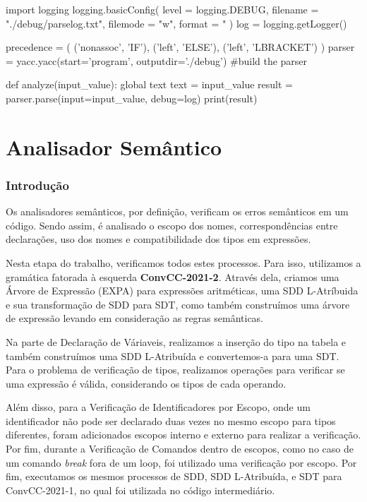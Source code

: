 \documentclass[
	12pt,				%
	openright,			%
	twoside,			%
	a4paper,			%
	english,			%
	french,				%
	spanish,			%
	brazil				%
	]{abntex2}
\begin{document}
\begin{python}
import logging
logging.basicConfig(
    level = logging.DEBUG,
    filename = "./debug/parselog.txt",
    filemode = "w",
    format = "%
)
log = logging.getLogger()

precedence = (
    ('nonassoc', 'IF'), 
    ('left', 'ELSE'),
    ('left', 'LBRACKET')
)
parser = yacc.yacc(start='program', outputdir='./debug')  #build the parser

def analyze(input_value):
    global text
    text = input_value
    result = parser.parse(input=input_value, debug=log)
    print(result)
\end{python}


\part{Analisador Semântico}

\section{Introdução}
Os analisadores semânticos, por definição, verificam os erros semânticos em um código.
Sendo assim, é analisado o escopo dos nomes, correspondências entre declarações, uso dos nomes e
compatibilidade dos tipos em expressões.

Nesta etapa do trabalho, verificamos todos estes processos.
Para isso, utilizamos a gramática fatorada à esquerda \textbf{ConvCC-2021-2}.
Através dela, criamos uma Árvore de Expressão (EXPA) para expressões aritméticas, uma SDD L-Atríbuida e 
sua transformação de SDD para SDT, como também construímos uma árvore de expressão levando em consideração
as regras semânticas.

Na parte de Declaração de Váriaveis, realizamos a inserção do tipo na tabela
e também construímos uma SDD L-Atribuída e convertemos-a para uma SDT.
Para o problema de verificação de tipos, realizamos operações para
verificar se uma expressão é válida, considerando os tipos de cada operando.

Além disso, para a Verificação de Identificadores por Escopo, onde um identificador
não pode ser declarado duas vezes no mesmo escopo para tipos diferentes, foram
adicionados escopos interno e externo para realizar a verificação. Por fim, durante
a Verificação de Comandos dentro de escopos, como no caso de um comando \emph{break}
fora de um loop, foi utilizado uma verificação por escopo. Por fim,
executamos os mesmos processos de SDD, SDD L-Atribuída, e SDT para ConvCC-2021-1,
no qual foi utilizada no código intermediário.
\end{document}

